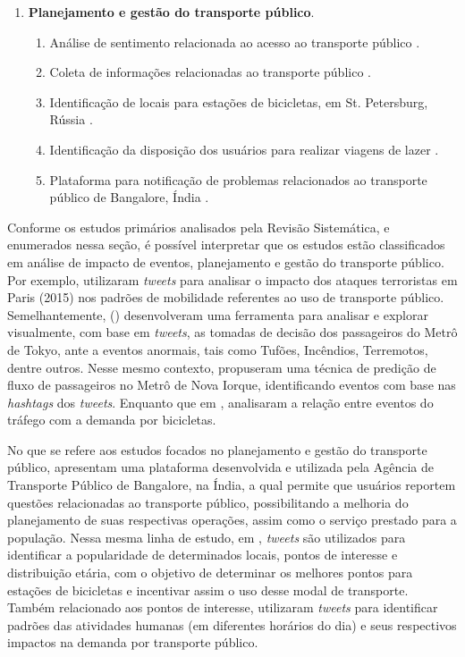 \documentclass[
	12pt,				%
	oneside,			%
	a4paper,			%
	english,			%
	brazil				%
	]{abntex2ppgsi}
\begin{document}
{{\begin{enumerate}
\item \textbf{Planejamento e gestão do transporte público}.
\begin{enumerate}
\item Análise de sentimento relacionada ao acesso ao transporte público \cite{Guo2016}.
\item Coleta de informações relacionadas ao transporte público \cite{Gal-Tzur2014}.
\item Identificação de locais para estações de bicicletas, em St. Petersburg, Rússia \cite{Gutev2016}.
\item Identificação da disposição dos usuários para realizar viagens de lazer \cite{Gkiotsalitis2016}.
\item Plataforma para notificação de problemas relacionados ao transporte público de Bangalore, Índia \cite{Mukherjee2015}.
\end{enumerate} 
\end{enumerate}

Conforme os estudos primários analisados pela Revisão Sistemática, e enumerados nessa seção, é possível interpretar que os estudos estão classificados em análise de impacto de eventos, planejamento e gestão do transporte público. Por exemplo, \cite{Wen2016} utilizaram \textit{tweets} para analisar o impacto dos ataques terroristas em Paris (2015) nos padrões de mobilidade referentes ao uso de transporte público. Semelhantemente, \citeauthor{Itoh2016} (\citeyear{Itoh2016}) desenvolveram uma ferramenta para analisar e explorar visualmente, com base em \textit{tweets}, as tomadas de decisão dos passageiros do Metrô de Tokyo, ante a eventos anormais, tais como Tufões, Incêndios, Terremotos, dentre outros. Nesse mesmo contexto, \cite{Ni2016} propuseram uma técnica de predição de fluxo de passageiros no Metrô de Nova Iorque, identificando eventos com base nas \textit{hashtags} dos \textit{tweets}. Enquanto que em \cite{Chen2016}, analisaram a relação entre eventos do tráfego com a demanda por bicicletas.

No que se refere aos estudos focados no planejamento e gestão do transporte público, \cite{Mukherjee2015} apresentam uma plataforma desenvolvida e utilizada pela Agência de Transporte Público de Bangalore, na Índia, a qual permite que usuários reportem questões relacionadas ao transporte  público, possibilitando a melhoria do planejamento de suas respectivas operações, assim como o serviço prestado para a população. Nessa mesma linha de estudo, em \cite{Gutev2016}, \textit{tweets} são utilizados para identificar a popularidade de determinados locais, pontos de interesse e distribuição etária, com o objetivo de determinar os melhores pontos para estações de bicicletas e incentivar assim o uso desse modal de transporte. Também relacionado aos pontos de interesse, \cite{Maghrebi2015} utilizaram \textit{tweets} para identificar padrões das atividades humanas (em diferentes horários do dia) e seus respectivos impactos na demanda por transporte público.

}}
\end{document}
